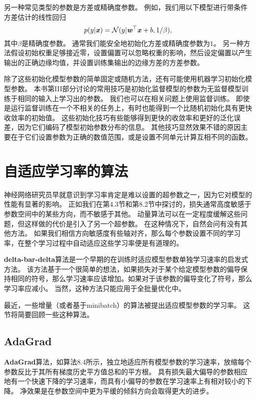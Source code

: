 另一种常见类型的参数是方差或精确度参数。
例如，我们用以下模型进行带条件方差估计的线性回归
\begin{equation}
    p(y|\boldsymbol{\mathit{x}}) = \mathcal{N} (y | \boldsymbol{\mathit{w}}^\top \boldsymbol{\mathit{x}} + b, 1/\beta) ,
\end{equation}
其中$\beta$是精确度参数。
通常我们能安全地初始化方差或精确度参数为$1$。
另一种方法假设初始权重足够接近零，设置偏置可以忽略权重的影响，然后设定偏置以产生输出的正确边缘均值，并设置训练集输出的边缘方差的方差参数。


除了这些初始化模型参数的简单固定或随机方法，还有可能使用机器学习初始化模型参数。
本书第III部分讨论的常用技巧是初始化监督模型的参数为无监督模型训练于相同的输入上学习出的参数。
我们也可以在相关问题上使用监督训练。
即使是运行监督训练在一个不相关的任务上，有时也能得到一个比随机初始化具有更快收敛率的初始值。
这些初始化技巧有些能够得到更快的收敛率和更好的泛化误差，因为它们编码了模型初始参数分布的信息。
其他技巧显然效果不错的原因主要在于它们设置参数为正确的数值范围，或是设置不同单元计算互相不同的函数。

\section{自适应学习率的算法}
\label{sec:algorithms_with_adaptive_learning_rates}
神经网络研究员早就意识到学习率肯定是难以设置的超参数之一，因为它对模型的性能有显著的影响。
正如我们在第4.3节和第8.2节中探讨的，损失通常高度敏感于参数空间中的某些方向，而不敏感于其他。
动量算法可以在一定程度缓解这些问题，但这样做的代价是引入了另一个超参数。
在这种情况下，自然会问有没有其他方法。
如果我们相信方向敏感度有些轴对齐，那么每个参数设置不同的学习率，在整个学习过程中自动适应这些学习率便是有道理的。

\textbf{delta-bar-delta}算法\citep{jacobs1988}是一个早期的在训练时适应模型参数单独学习速率的启发式方法。
该方法基于一个很简单的想法，如果损失对于某个给定模型参数的偏导保持相同的符号，那么学习速率应该增加。如果对于该参数的偏导变化了符号，那么学习率应减小。
当然，这种方法只能应用于全批量优化中。

最近，一些增量（或者基于\gls{minibatch}）的算法被提出适应模型参数的学习率。
这节将简要回顾一些这种算法。


\subsection{AdaGrad}
\label{sec:adagrad}
\textbf{AdaGrad}算法，如算法8.4所示，独立地适应所有模型参数的学习速率，放缩每个参数反比于其所有梯度历史平方值总和的平方根\citep{Duchi+al-2011}。
具有损失最大偏导的参数相应地有一个快速下降的学习速率，而具有小偏导的参数在学习速率上有相对较小的下降。
净效果是在参数空间中更为平缓的倾斜方向会取得更大的进步。

